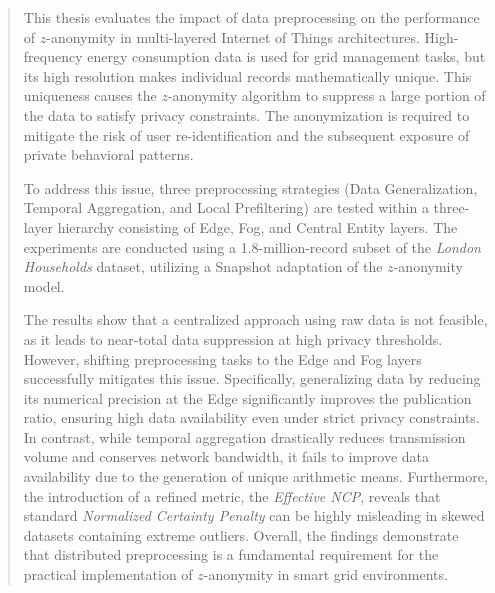 \begin{abstract}
This thesis evaluates the impact of data preprocessing on the performance of $z$-anonymity in multi-layered Internet of Things architectures. High-frequency energy consumption data is used for grid management tasks, but its high resolution makes individual records mathematically unique. This uniqueness causes the $z$-anonymity algorithm to suppress a large portion of the data to satisfy privacy constraints. The anonymization is required to mitigate the risk of user re-identification and the subsequent exposure of private behavioral patterns.

To address this issue, three preprocessing strategies (Data Generalization, Temporal Aggregation, and Local Prefiltering) are tested within a three-layer hierarchy consisting of Edge, Fog, and Central Entity layers. The experiments are conducted using a 1.8-million-record subset of the \textit{London Households} dataset, utilizing a Snapshot adaptation of the $z$-anonymity model.

The results show that a centralized approach using raw data is not feasible, as it leads to near-total data suppression at high privacy thresholds. However, shifting preprocessing tasks to the Edge and Fog layers successfully mitigates this issue. Specifically, generalizing data by reducing its numerical precision at the Edge significantly improves the publication ratio, ensuring high data availability even under strict privacy constraints. In contrast, while temporal aggregation drastically reduces transmission volume and conserves network bandwidth, it fails to improve data availability due to the generation of unique arithmetic means. Furthermore, the introduction of a refined metric, the \textit{Effective NCP}, reveals that standard \textit{Normalized Certainty Penalty} can be highly misleading in skewed datasets containing extreme outliers. Overall, the findings demonstrate that distributed preprocessing is a fundamental requirement for the practical implementation of $z$-anonymity in smart grid environments.
\end{abstract}